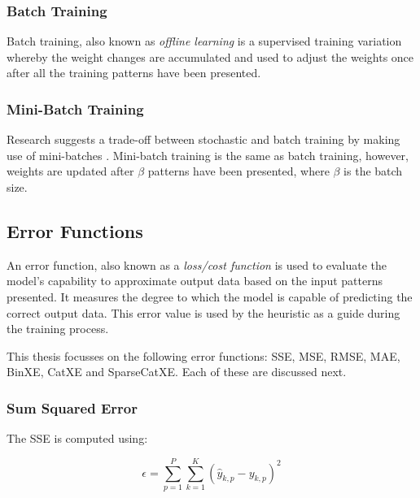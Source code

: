 \subsubsection{Batch Training}
\label{sec:anns:training:batch}

Batch training, also known as \textit{offline learning} is a supervised training variation whereby
the weight changes are accumulated and used to adjust the weights once after all
the training patterns have been presented. 


\subsubsection{Mini-Batch Training}
\label{sec:anns:training:mini_batch}

Research suggests a trade-off between stochastic and batch training by making
use of mini-batches \cite{ref:bengio:2012}. Mini-batch training is the same as
batch training, however, weights are updated after $\beta$ patterns have been
presented, where $\beta$ is the batch size.


\subsection{Error Functions}
\label{sec:anns:training:error_functions}

An error function, also known as a \textit{loss/cost function} \cite{ref:changhau:2017} is used to
evaluate the model's capability to approximate output data based on the input
patterns presented. It measures the degree to which the model is capable of
predicting the correct output data.  This error value is used by the
heuristic as a guide during the training process.

This thesis focusses on the following error functions: \ac{SSE}, \ac{MSE},
\ac{RMSE}, \ac{MAE}, \ac{BinXE}, \ac{CatXE} and \ac{SparseCatXE}. Each of these
are discussed next.


\subsubsection{Sum Squared Error}
\label{sec:anns:training:error_functions:sse}

The \ac{SSE} is computed using:

\begin{equation}
    \epsilon = \sum_{p=1}^P \sum_{k=1}^K (\hat{y}_{k,p} - y_{k,p})^2
    \label{eq:sse}
\end{equation}

